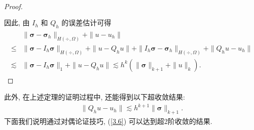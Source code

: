 \begin{proof}
\begin{align}
\begin{split}
\end{split}
\end{align}
因此, 由 $I_h$ 和 $Q_h$ 的误差估计可得
\begin{align}\begin{split}
\label{3.5}
&\|\boldsymbol\sigma-\boldsymbol\sigma_h\|_{H(\div,\Omega)}+\|u-u_h\|\\
\leq&\|\boldsymbol\sigma-I_h\boldsymbol\sigma\|_{H(\div,\Omega)}+\|u-Q_h u\|+\|I_h\boldsymbol\sigma-\boldsymbol\sigma_h\|_{H(\div,\Omega)}+\|Q_h u-u_h\|\\
\lesssim&\|\boldsymbol\sigma-I_h\boldsymbol\sigma\|_1+\|u-Q_h u\|\lesssim h^k(\|\boldsymbol\sigma\|_{k+1}+\|u\|_k).
\end{split}
\end{align}
\end{proof}

此外, 在上述定理的证明过程中, 还能得到以下超收敛结果:
\begin{align}
\label{3.6}\|Q_h u-u_h\|\lesssim h^{k+1}\|\boldsymbol\sigma\|_{k+1}.
\end{align}
下面我们说明通过对偶论证技巧, (\ref{3.6}) 可以达到超2阶收敛的结果.

